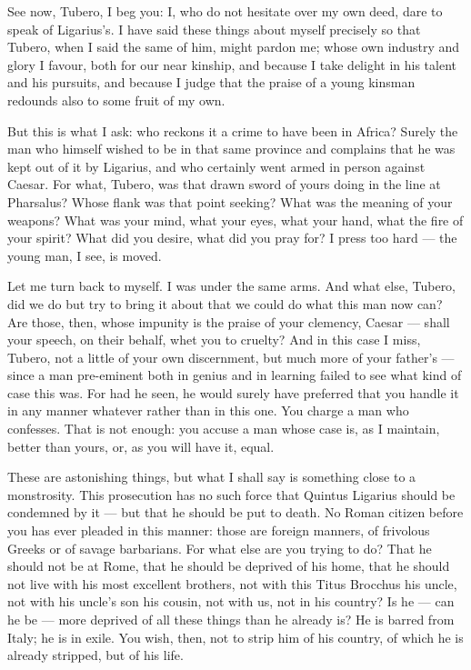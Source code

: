  See now, Tubero, I beg you: I, who do not hesitate over my own deed, dare to speak of Ligarius's. I have said these things about myself precisely so that Tubero, when I said the same of him, might pardon me; whose own industry and glory I favour, both for our near kinship, and because I take delight in his talent and his pursuits, and because I judge that the praise of a young kinsman redounds also to some fruit of my own.

 But this is what I ask: who reckons it a crime to have been in Africa? Surely the man who himself wished to be in that same province and complains that he was kept out of it by Ligarius, and who certainly went armed in person against Caesar. For what, Tubero, was that drawn sword of yours doing in the line at Pharsalus? Whose flank was that point seeking? What was the meaning of your weapons? What was your mind, what your eyes, what your hand, what the fire of your spirit? What did you desire, what did you pray for? I press too hard --- the young man, I see, is moved.

 Let me turn back to myself. I was under the same arms. And what else, Tubero, did we do but try to bring it about that we could do what this man now can? Are those, then, whose impunity is the praise of your clemency, Caesar --- shall your speech, on their behalf, whet you to cruelty? And in this case I miss, Tubero, not a little of your own discernment, but much more of your father's --- since a man pre-eminent both in genius and in learning failed to see what kind of case this was. For had he seen, he would surely have preferred that you handle it in any manner whatever rather than in this one. You charge a man who confesses. That is not enough: you accuse a man whose case is, as I maintain, better than yours, or, as you will have it, equal.

 These are astonishing things, but what I shall say is something close to a monstrosity. This prosecution has no such force that Quintus Ligarius should be condemned by it --- but that he should be put to death. No Roman citizen before you has ever pleaded in this manner: those are foreign manners, of frivolous Greeks or of savage barbarians. For what else are you trying to do? That he should not be at Rome, that he should be deprived of his home, that he should not live with his most excellent brothers, not with this Titus Brocchus his uncle, not with his uncle's son his cousin, not with us, not in his country? Is he --- can he be --- more deprived of all these things than he already is? He is barred from Italy; he is in exile. You wish, then, not to strip him of his country, of which he is already stripped, but of his life.

